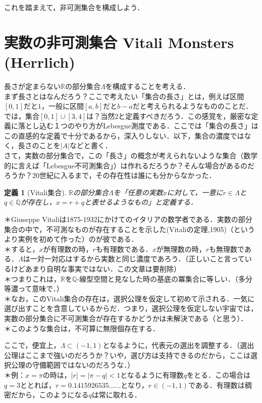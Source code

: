 \documentclass[uplatex, 12pt, a4paper]{jsarticle}
\newtheorem{definition}{定義}
\begin{document}
\noindent
これを踏まえて，非可測集合を構成しよう．
\section{実数の非可測集合 Vitali Monsters (Herrlich)}
\vspace{5mm}

\noindent
長さが定まらない$\mathbb{R}$の部分集合$\Lambda$を構成することを考える．\\
まず長さとはなんだろう？ここで考えたい「集合の長さ」とは，例えば区間$[0,1]$だと$1$，一般に区間$[a,b]$だと$b-a$だと考えられるようなもののことだ．では，集合$[0,1]\cup[3,4]$は？当然$2$と定義すべきだろう．この感覚を，厳密な定義に落とし込む１つのやり方がLebesgue測度である．ここでは「集合の長さ」はこの直感的な定義で十分であるから，深入りしない．以下，集合の濃度ではなく，長さのことを$|A|$などと書く．\\さて，実数の部分集合で，この「長さ」の概念が考えられないような集合（数学的に言えば「Lebesgue不可測集合」）は作れるだろうか？そんな場合があるのだろうか？20世紀に入るまで，その存在性は誰にも分からなかった．\\[3mm]
\begin{shadebox}\begin{definition}[Vitali集合]$\mathbb{R}$の部分集合$\Lambda$を「任意の実数$x$に対して，一意に$r \in \Lambda$と$q\in \mathbb{Q}$が存在し，$x=r+q$と表せるようなもの」と定義する．\end{definition}\end{shadebox}
\noindent
＊Giuseppe Vitaliは1875-1932にかけてのイタリアの数学者である．実数の部分集合の中で，不可測なものが存在することを示した(Vitaliの定理,1905)（というより実例を初めて作った）のが彼である．\\
＊すると，$x$が有理数の時，$r$も有理数である．$x$が無理数の時，$r$も無理数である．$\Lambda$は一対一対応はするから実数と同じ濃度であろう．（正しいこと言っているけどあまり自明な事実ではない．この文章は要削除）\\
＊つまりこれは，$\mathbb{R}$を$\mathbb{Q}$-線型空間と見なした時の基底の冪集合に等しい．（多分等濃って意味で．）\\
＊なお，このVitali集合の存在は，選択公理を仮定して初めて示される．一気に選び出すことを含意しているからだ．つまり，選択公理を仮定しない宇宙では，実数の部分集合に不可測集合が存在するかどうかは未解決である（と思う）．\\
＊このような集合は，不可算に無限個存在する．

\noindent
ここで，便宜上，$\Lambda \subset (-1,1)$となるように，代表元の選出を調整する．（選出公理はここまで強いのだろうか？いや，選び方は支持できるのだから，ここは選択公理の守備範囲ではないのだろうな．）\\
＊例：$x=\pi$の時は，$|r|=|\pi-q|<1$となるように有理数$q$をとる．この場合は$q=3$ととれば，$r=0.1415926535......$となり，$r\in(-1,1)$である．有理数は稠密だから，このようになる$q$は常に取れる．\\[5mm]
\end{document}
